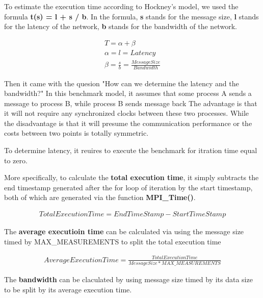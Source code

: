
To estimate the execution time according to Hockney's model,
we used the formula \textbf{t(s) = l + s / b}. In the formula,
\textbf{s} stands for the message size,
\textbf{l} stands for the latency of the network,
\textbf{b} stands for the bandwidth of the network.


\begin{gather*}
    T = \alpha + \beta \\
    \alpha = l = Latency \\
    \beta = \frac{s}{b} = \frac{Message Size}{Bandwidth}
\end{gather*}


Then it came with the quesion "How can we determine the latency and the bandwidth?"
In this benchmark model, it assumes that some process A sends a message to process B, while process B sends message back
The advantage is that it will not require any synchronized clocks between these two processes.
While the disadvantage is that it will presume the communication performance or the costs between two points is totally symmetric.

To determine latency, it reuires to execute the benchmark for itration time equal to zero.

More specifically, to calculate the \textbf{total execution time},
it simply subtracts the end timestamp generated after the for loop of iteration
by the start timestamp, both of which are generated via the function \textbf{MPI\_Time()}.

\begin{equation*}
    \begin{aligned}
        TotalExecutionTime = EndTimeStamp - StartTimeStamp
    \end{aligned}
\end{equation*}

The \textbf{average executioin time} can be calculated via using the message size timed by MAX\_MEASUREMENTS to split the total execution time

\begin{equation*}
    \begin{aligned}
        AverageExecutionTime = \frac{TotalExecutionTime} {MessageSize * MAX\_MEASUREMENTS}
    \end{aligned}
\end{equation*}

The \textbf{bandwidth} can be claculated by using message size timed by its data size to be split by its average execution time.


